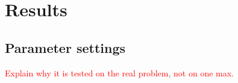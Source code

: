 \chapter{Results}


\section{Parameter settings}
\textcolor{red}{Explain why it is tested on the real problem, not on one max.}